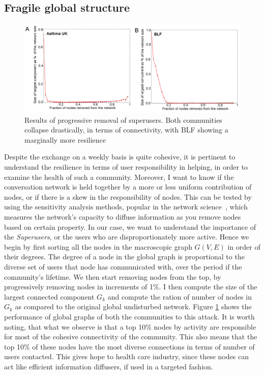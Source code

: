 \subsection{Fragile global structure}
\label{sec:fragility}
\begin{figure}[!ht]
    \includegraphics[width=\textwidth]{jmirSensitivity.png}
    \caption{Results of progressive removal of superusers. Both communities collapse drastically, in terms of connectivity, with BLF showing a marginally more resilience }
    \label{fig:sense_asthma}
\end{figure}
Despite the exchange on a weekly basis is quite cohesive, it is pertinent to understand the resilience in terms of user responsibility in helping, in order to examine the health of such a community. Moreover, I want to know if the conversation network is held together by a more or less uniform contribution of nodes, or if there is a skew in the responsibility of nodes. 
This can be tested by using the sensitivity analysis methods, popular in the network science~\cite{braunstein2016network,albert2000error}, which measures the network's capacity to diffuse information as you remove nodes based on certain property. In our case, we want to understand the importance of the \textsl{Superusers}, or the users who are disproportionately more active. Hence we begin by first sorting all the nodes in the macroscopic graph $G(V,E)$ in order of their degrees. The degree of a node in the global graph is proportional to the diverse set of users that node has communicated with, over the period if the community's lifetime. We then start removing nodes from the top, by progressively removing nodes in increments of 1\%. I then compute the size of the largest connected component $G_k$ and compute the ration of number of nodes in $G_k$ as compared to the original global undisturbed network.  Figure \ref{fig:sense_asthma} shows the performance of global graphs of both the communities to this attack. It is worth noting, that what we observe is that a top 10\% nodes by activity are responsible for most of the cohesive connectivity of the community. This also means that the top 10\% of these nodes have the most diverse connections in terms of number of users contacted. This gives hope to health care industry, since these nodes can act like efficient information diffusers, if used in a targeted fashion. 

